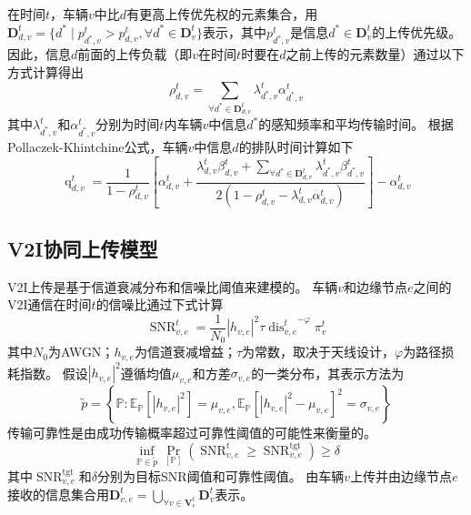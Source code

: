 在时间$t$，车辆$v$中比$d$有更高上传优先权的元素集合，用$\mathbf{D}_{d, v}^t = \{ d^* \mid p_{d^*, v}^{t} > p_{d, v}^{t} , \forall d^* \in \mathbf{D}_v^t \}$表示，其中$p_{d^*, v}^{t}$是信息$d^* \in \mathbf{D}_v^t$的上传优先级。
因此，信息$d$前面的上传负载（即$v$在时间$t$时要在$d$之前上传的元素数量）通过以下方式计算得出 
\begin{equation}
	\rho_{d, v}^{t}=\sum_{\forall d^* \in \mathbf{D}_{d, v}^t} \lambda_{d^*, v}^t \alpha_{d^*, v}^t
\end{equation}
其中$\lambda_{d^*, v}^t$和$\alpha_{d^*, v}^t$分别为时间$t$内车辆$v$中信息$d^*$的感知频率和平均传输时间。
根据Pollaczek-Khintchine公式\cite{takine2001queue}，车辆$v$中信息$d$的排队时间计算如下 
\begin{equation}
    \operatorname{q}_{d, v}^t= \frac{1} {1 - \rho_{d, v}^{t}} 
        \left[ \alpha_{d, v}^t + \frac{ \lambda_{d, v}^{t} \beta_{d, v}^t + \sum\limits_{\forall d^* \in \mathbf{D}_{d, v}^t} \lambda_{d^*, v}^t \beta_{d^*, v}^t }{2\left(1-\rho_{d, v}^{t} - \lambda_{d, v}^{t} \alpha_{d, v}^t\right)}\right] 
        - \alpha_{d, v}^t
\end{equation}

\subsection{V2I协同上传模型}
V2I上传是基于信道衰减分布和信噪比阈值来建模的。
车辆$v$和边缘节点$e$之间的V2I通信在时间$t$的信噪比通过下式计算\cite{sadek2009distributed}
\begin{equation}
    \operatorname{SNR}_{v, e}^{t}=\frac{1}{N_{0}} \left|h_{v, e}\right|^{2} \tau {\operatorname{dis}_{v, e}^{t}}^{-\varphi} {\pi}_v^t
\end{equation}
其中$N_{0}$为AWGN；$h_{v, e}$为信道衰减增益；$\tau$为常数，取决于天线设计，$\varphi$为路径损耗指数。
假设$\left|h_{v, e}\right|^{2}$遵循均值$\mu_{v, e}$和方差$\sigma_{v, e}$的一类分布，其表示方法为
\begin{equation}
    \tilde{p}=\left\{\mathbb{P}: \mathbb{E}_{\mathbb{P}}\left[\left|h_{v, e}\right|^{2}\right]=\mu_{v, e}, \mathbb{E}_{\mathbb{P}}\left[\left|h_{v, e}\right|^{2}-\mu_{v, e}\right]^{2}=\sigma_{v, e}\right\}
\end{equation}
传输可靠性是由成功传输概率超过可靠性阈值的可能性来衡量的。
\begin{equation}
    \inf_{\mathbb{P} \in \tilde{p}} \operatorname{Pr}_{[\mathbb{P}]}\left(\operatorname{SNR}_{v, e}^{t} \geq \operatorname{SNR}_{v, e}^{\operatorname{tgt}}\right) \geq \delta
\end{equation}
\noindent 其中$\operatorname{SNR}_{v, e}^{\operatorname{tgt}}$和$\delta$分别为目标SNR阈值和可靠性阈值。
由车辆$v$上传并由边缘节点$e$接收的信息集合用$\mathbf{D}_{v, e}^{t} = \bigcup_{\forall v \in \mathbf{V}_{e}^{t}} \mathbf{D}_{v}^{t}$表示。

